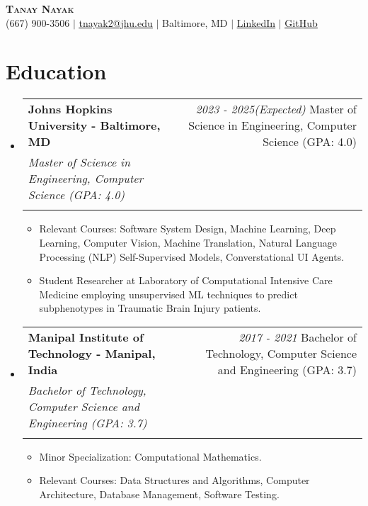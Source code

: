 \documentclass[letterpaper,10pt]{article} %
\makeatletter
\newcommand{\resumeItem}[1]{
  \item\small{
    {#1 \vspace{-1pt}}
  }
}
\newcommand{\resumeSubheading}[4]{
  \vspace{-2pt}\item
    \begin{tabular*}{0.97\textwidth}[t]{l@{\extracolsep{\fill}}r}
      \textbf{#1 - #2} & \textit{\small #4}
      \def\temp{#3}%
      \ifx\temp\empty %
      \else
        \\
        \textit{\small#3}\\
      \fi
    \end{tabular*}\vspace{-7pt}
}
\newcommand{\resumeSubHeadingListStart}{\begin{itemize}[leftmargin=0.15in, label={}]}
\newcommand{\resumeSubHeadingListEnd}{\end{itemize}}
\newcommand{\resumeItemListStart}{\begin{itemize}}
\newcommand{\resumeItemListEnd}{\end{itemize}\vspace{-5pt}}
\makeatother
\begin{document}
\begin{center}
    \textbf{\Huge \scshape Tanay Nayak} \\ \vspace{1pt}
    \small (667) 900-3506 $|$ \href{mailto:tnayak2@jhu.edu}{\underline{tnayak2@jhu.edu}} $|$ 
    Baltimore, MD $|$
    \href{https://www.linkedin.com/in/tanay-nayak/}{\underline{LinkedIn}} $|$
    \href{https://github.com/tanaynayak}{\underline{GitHub}}
\end{center}

\section{Education}
  \resumeSubHeadingListStart
    \resumeSubheading
      {Johns Hopkins University}{Baltimore, MD}
      {Master of Science in Engineering, Computer Science (GPA: 4.0)}{2023 - 2025(Expected)}
    \begin{itemize}
        \resumeItem{Relevant Courses: Software System Design, Machine Learning, Deep Learning, Computer Vision, Machine Translation, Natural Language Processing (NLP) Self-Supervised Models, Converstational UI Agents.}
        \item Student Researcher at Laboratory of Computational Intensive Care Medicine employing unsupervised ML techniques to predict subphenotypes in Traumatic Brain Injury patients.
    \end{itemize}
    
    \resumeSubheading
      {Manipal Institute of Technology}{Manipal, India}
      {Bachelor of Technology, Computer Science and Engineering (GPA: 3.7)}{2017 - 2021}
    \resumeItemListStart
        \resumeItem{Minor Specialization: Computational Mathematics.}
        \resumeItem{ Relevant Courses: Data Structures and Algorithms, Computer Architecture, Database Management, Software Testing.}
    \resumeItemListEnd
  \resumeSubHeadingListEnd
\end{document}
